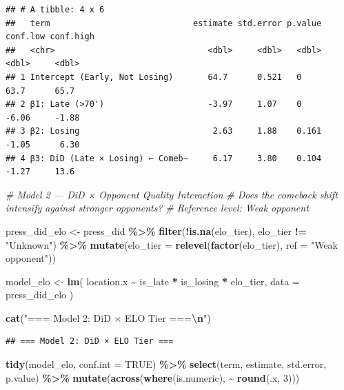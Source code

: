 \documentclass[
]{article}
\newenvironment{Shaded}{\begin{snugshade}}{\end{snugshade}}
\newcommand{\AttributeTok}[1]{\textcolor[rgb]{0.13,0.29,0.53}{#1}}
\newcommand{\CommentTok}[1]{\textcolor[rgb]{0.56,0.35,0.01}{\textit{#1}}}
\newcommand{\ConstantTok}[1]{\textcolor[rgb]{0.56,0.35,0.01}{#1}}
\newcommand{\DecValTok}[1]{\textcolor[rgb]{0.00,0.00,0.81}{#1}}
\newcommand{\FunctionTok}[1]{\textcolor[rgb]{0.13,0.29,0.53}{\textbf{#1}}}
\newcommand{\NormalTok}[1]{#1}
\newcommand{\OtherTok}[1]{\textcolor[rgb]{0.56,0.35,0.01}{#1}}
\newcommand{\SpecialCharTok}[1]{\textcolor[rgb]{0.81,0.36,0.00}{\textbf{#1}}}
\newcommand{\StringTok}[1]{\textcolor[rgb]{0.31,0.60,0.02}{#1}}
\begin{document}
\begin{verbatim}
## # A tibble: 4 x 6
##   term                             estimate std.error p.value conf.low conf.high
##   <chr>                               <dbl>     <dbl>   <dbl>    <dbl>     <dbl>
## 1 Intercept (Early, Not Losing)       64.7      0.521   0        63.7      65.7 
## 2 β1: Late (>70')                     -3.97     1.07    0        -6.06     -1.88
## 3 β2: Losing                           2.63     1.88    0.161    -1.05      6.30
## 4 β3: DiD (Late × Losing) ← Comeb~     6.17     3.80    0.104    -1.27     13.6
\end{verbatim}

\begin{Shaded}
\begin{Highlighting}[]
\CommentTok{\# Model 2 — DiD × Opponent Quality Interaction}
\CommentTok{\# Does the comeback shift intensify against stronger opponents?}
\CommentTok{\# Reference level: Weak opponent}

\NormalTok{press\_did\_elo }\OtherTok{\textless{}{-}}\NormalTok{ press\_did }\SpecialCharTok{\%\textgreater{}\%}
  \FunctionTok{filter}\NormalTok{(}\SpecialCharTok{!}\FunctionTok{is.na}\NormalTok{(elo\_tier), elo\_tier }\SpecialCharTok{!=} \StringTok{"Unknown"}\NormalTok{) }\SpecialCharTok{\%\textgreater{}\%}
  \FunctionTok{mutate}\NormalTok{(}\AttributeTok{elo\_tier =} \FunctionTok{relevel}\NormalTok{(}\FunctionTok{factor}\NormalTok{(elo\_tier), }\AttributeTok{ref =} \StringTok{"Weak opponent"}\NormalTok{))}

\NormalTok{model\_elo }\OtherTok{\textless{}{-}} \FunctionTok{lm}\NormalTok{(}
\NormalTok{  location.x }\SpecialCharTok{\textasciitilde{}}\NormalTok{ is\_late }\SpecialCharTok{*}\NormalTok{ is\_losing }\SpecialCharTok{*}\NormalTok{ elo\_tier,}
  \AttributeTok{data =}\NormalTok{ press\_did\_elo}
\NormalTok{)}

\FunctionTok{cat}\NormalTok{(}\StringTok{"=== Model 2: DiD × ELO Tier ===}\SpecialCharTok{\textbackslash{}n}\StringTok{"}\NormalTok{)}
\end{Highlighting}
\end{Shaded}

\begin{verbatim}
## === Model 2: DiD × ELO Tier ===
\end{verbatim}

\begin{Shaded}
\begin{Highlighting}[]
\FunctionTok{tidy}\NormalTok{(model\_elo, }\AttributeTok{conf.int =} \ConstantTok{TRUE}\NormalTok{) }\SpecialCharTok{\%\textgreater{}\%}
  \FunctionTok{select}\NormalTok{(term, estimate, std.error, p.value) }\SpecialCharTok{\%\textgreater{}\%}
  \FunctionTok{mutate}\NormalTok{(}\FunctionTok{across}\NormalTok{(}\FunctionTok{where}\NormalTok{(is.numeric), }\SpecialCharTok{\textasciitilde{}} \FunctionTok{round}\NormalTok{(.x, }\DecValTok{3}\NormalTok{)))}
\end{Highlighting}
\end{Shaded}
\end{document}
